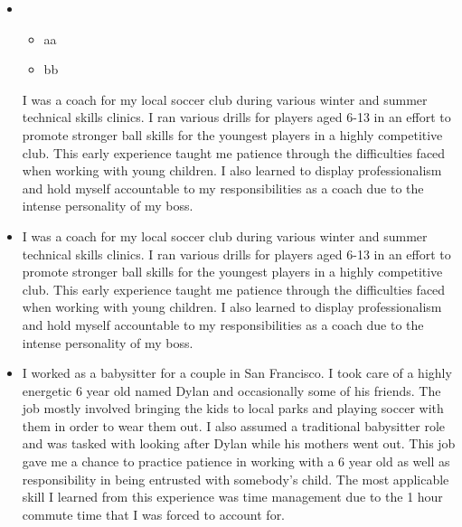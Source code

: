 \documentclass[11pt,a4paper,sans]{moderncv}        %
\begin{document}
\begin{itemize}

\item{
	{\vspace{3pt}
		\begin{itemize}
			\item aa
			\item bb
		\end{itemize}
		I was a coach for my local soccer club during various winter and summer technical skills clinics. I ran various drills for players aged 6-13 in an effort to promote stronger ball skills for the youngest players in a highly competitive club. This early experience taught me patience through the difficulties faced when working with young children. I also learned to display professionalism and hold myself accountable to my responsibilities as a coach due to the intense personality of my boss. }}

\item{
	{\vspace{3pt}
		I was a coach for my local soccer club during various winter and summer technical skills clinics. I ran various drills for players aged 6-13 in an effort to promote stronger ball skills for the youngest players in a highly competitive club. This early experience taught me patience through the difficulties faced when working with young children. I also learned to display professionalism and hold myself accountable to my responsibilities as a coach due to the intense personality of my boss. }}


\vspace{6pt}

\item{
	{\vspace{3pt}
		I worked as a babysitter for a couple in San Francisco. I took care of a highly energetic 6 year old named Dylan and occasionally some of his friends. The job mostly involved bringing the kids to local parks and playing soccer with them in order to wear them out. I also assumed a traditional babysitter role and was tasked with looking after Dylan while his mothers went out. This job gave me a chance to practice patience in working with a 6 year old as well as responsibility in being entrusted with somebody's child. The most applicable skill I learned from this experience was time management due to the 1 hour commute time that I was forced to account for. }}


\end{itemize}
\end{document}

